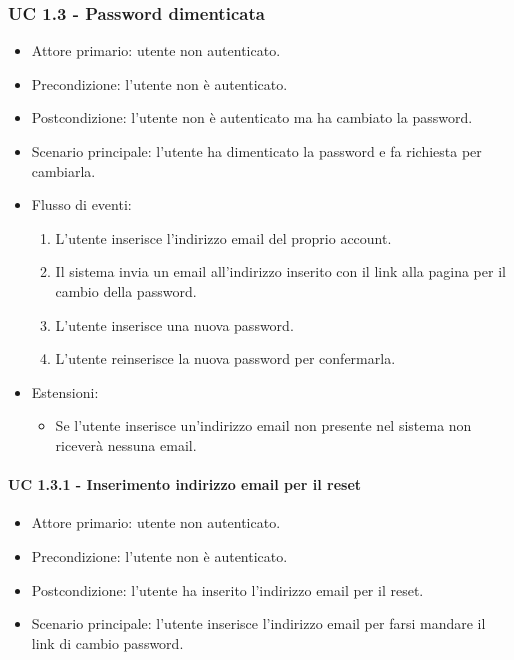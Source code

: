     \subsubsection{UC 1.3 - Password dimenticata}
        \begin{itemize}
            \item Attore primario: utente non autenticato.
            \item Precondizione: l'utente non è autenticato.
            \item Postcondizione: l'utente non è autenticato ma ha cambiato la password.
            \item Scenario principale: l'utente ha dimenticato la password e fa richiesta per cambiarla.
            \item Flusso di eventi:
                \begin{enumerate}
                    \item L'utente inserisce l'indirizzo email del proprio account.
                    \item Il sistema invia un email all'indirizzo inserito con il link alla pagina per il cambio della password.
                    \item L'utente inserisce una nuova password.
                    \item L'utente reinserisce la nuova password per confermarla.
                \end{enumerate}
            \item Estensioni:
                \begin{itemize}
                    \item Se l'utente inserisce un'indirizzo email non presente nel sistema non riceverà nessuna email.
                \end{itemize}
        \end{itemize}
        \paragraph{UC 1.3.1 - Inserimento indirizzo email per il reset}
            \begin{itemize}
                \item Attore primario: utente non autenticato.
                \item Precondizione: l'utente non è autenticato.
                \item Postcondizione: l'utente ha inserito l'indirizzo email per il reset.
                \item Scenario principale: l'utente inserisce l'indirizzo email per farsi mandare il link di cambio password.
            \end{itemize}
